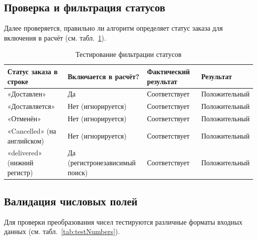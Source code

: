 \subsection{Проверка и фильтрация статусов}
Далее проверяется, правильно ли алгоритм определяет статус заказа для включения в расчёт (см. табл.~\ref{tab:testStatus}).

\begin{table}[H]
\caption{\label{tab:testStatus}Тестирование фильтрации статусов}
\small
\begin{center}
\vspace{-0.5cm}\begin{tabular}{|p{4.5cm}|p{4.5cm}|p{3cm}|p{3cm}|}
\hline
Статус заказа в строке & Включается в расчёт? & Фактический результат & Результат \\ \hline
«Доставлен» & Да & Соответствует & Положительный \\ \hline
«Доставляется» & Нет (игнорируется) & Соответствует & Положительный \\ \hline
«Отменён» & Нет (игнорируется) & Соответствует & Положительный \\ \hline
«Cancelled» (на английском) & Нет (игнорируется) & Соответствует & Положительный \\ \hline
«delivered» (нижний регистр) & Да (регистронезависимый поиск) & Соответствует & Положительный \\ \hline
\end{tabular}
\end{center}
\end{table}

\subsection{Валидация числовых полей}
Для проверки преобразования чисел тестируются различные форматы входных данных (см. табл.~\ref{tab:testNumbers}).

